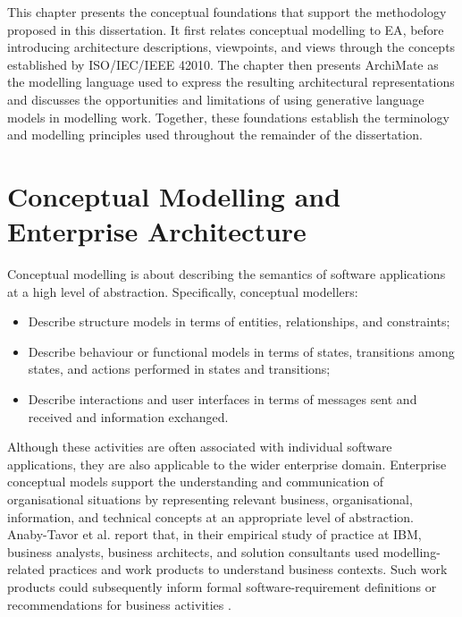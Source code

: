 \label{chap:cmodl}

This chapter presents the conceptual foundations that support the methodology proposed in this dissertation. It first relates conceptual modelling to \ac{EA}, before introducing architecture descriptions, viewpoints, and views through the concepts established by ISO/IEC/IEEE 42010. The chapter then presents ArchiMate as the modelling language used to express the resulting architectural representations and discusses the opportunities and limitations of using generative language models in modelling work. Together, these foundations establish the terminology and modelling principles used throughout the remainder of the dissertation.

\section{Conceptual Modelling and Enterprise Architecture}

Conceptual modelling is about describing the semantics of software applications at a high level of abstraction. Specifically, conceptual modellers:
\begin{itemize}
    \item Describe structure models in terms of entities, relationships, and constraints;
    \item Describe behaviour or functional models in terms of states, transitions among states, and actions performed in states and transitions;
    \item Describe interactions and user interfaces in terms of messages sent and received and information exchanged.
\end{itemize}

Although these activities are often associated with individual software applications, they are also applicable to the wider enterprise domain. Enterprise conceptual models support the understanding and communication of organisational situations by representing relevant business, organisational, information, and technical concepts at an appropriate level of abstraction. Anaby-Tavor et al. report that, in their empirical study of practice at IBM, business analysts, business architects, and solution consultants used modelling-related practices and work products to understand business contexts. Such work products could subsequently inform formal software-requirement definitions or recommendations for business activities \cite{AnabyTavorEtAl2010}.

